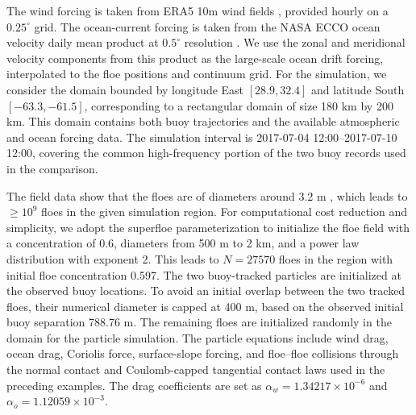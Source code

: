\documentclass[a4paper,11pt]{article}
\numberwithin{equation}{section}
\theoremstyle{definition}
\begin{document}


The wind forcing is taken from ERA5 10m wind fields \cite{hersbach2020era5}, provided hourly on a $0.25^\circ$ grid.  The ocean-current forcing is taken from the NASA ECCO ocean velocity daily mean product at $0.5^\circ$ resolution \cite{fenty2020ecco}.  We use the zonal and meridional velocity components from this product as the large-scale ocean drift forcing, interpolated to the floe positions and continuum grid.  
%
For the simulation, we consider the domain bounded by longitude East $[28.9,32.4]$ and latitude South $[-63.3,-61.5]$, corresponding to a rectangular domain of size 180 km by 200 km.  This domain contains both buoy trajectories and the available atmospheric and ocean forcing data.  The simulation interval is 2017-07-04 12:00--2017-07-10 12:00, covering the common high-frequency portion of the two buoy records used in the comparison.

The field data show that the floes are of diameters around 3.2 m \cite{alberello2019brief,alberello2022three}, which leads to $\ge 10^9$ floes in the given simulation region. For computational cost reduction and simplicity, we adopt the superfloe parameterization \cite{chen2022superfloe} to initialize the floe field with a concentration of 0.6, diameters from 500 m to 2 km, and a power law distribution with exponent 2. This leads to $N=27570$ floes in the region with initial floe concentration 0.597. The two buoy-tracked particles are initialized at the observed buoy locations.  To avoid an initial overlap between the two tracked floes, their numerical diameter is capped at 400 m, based on the observed initial buoy separation 788.76 m. The remaining floes are initialized randomly in the domain for the particle simulation.  The particle equations include wind drag, ocean drag, Coriolis force, surface-slope forcing, and floe--floe collisions through the normal contact and Coulomb-capped tangential contact laws used in the preceding examples.  The drag coefficients are set as $\alpha_w=1.34217\times10^{-6}$ and $\alpha_o=1.12059\times10^{-3}$.
\end{document}
